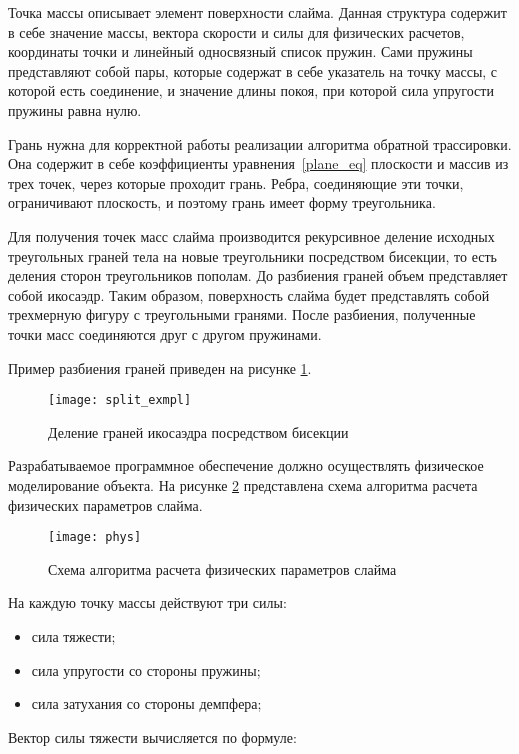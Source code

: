 Точка массы описывает элемент поверхности слайма. Данная структура содержит в себе значение массы, вектора скорости и силы для физических расчетов, координаты точки и линейный односвязный список пружин. Сами пружины представляют собой пары, которые содержат в себе указатель на точку массы, с которой есть соединение, и значение длины покоя, при которой сила упругости пружины равна нулю.

Грань нужна для корректной работы реализации алгоритма обратной трассировки. Она содержит в себе коэффициенты уравнения~\eqref{plane_eq} плоскости и массив из трех точек, через которые проходит грань. Ребра, соединяющие эти точки, ограничивают плоскость, и поэтому грань имеет форму треугольника.

Для получения точек масс слайма производится рекурсивное
деление исходных треугольных граней тела на новые треугольники посредством
бисекции, то есть деления сторон треугольников пополам. До разбиения граней
объем представляет собой икосаэдр. Таким образом, поверхность слайма будет представлять собой трехмерную фигуру с треугольными гранями. После разбиения, полученные точки масс соединяются друг с другом пружинами.

Пример разбиения граней приведен на рисунке \ref{split_exmpl}.

\begin{figure}[H]
	\centering
	\texttt{[image: split\_exmpl]}
	\caption{Деление граней икосаэдра посредством бисекции}
	\label{split_exmpl}
\end{figure}

Разрабатываемое программное обеспечение должно осуществлять физическое моделирование объекта. На рисунке \ref{phys} представлена схема алгоритма расчета физических параметров слайма.

\begin{figure}[H]
	\centering
	\texttt{[image: phys]}
	\caption{Схема алгоритма расчета физических параметров слайма}
	\label{phys}
\end{figure}

На каждую точку массы действуют три силы:

\begin{itemize}
	\item сила тяжести;
	\item сила упругости со стороны пружины;
	\item сила затухания со стороны демпфера;
\end{itemize}

Вектор силы тяжести вычисляется по формуле:

